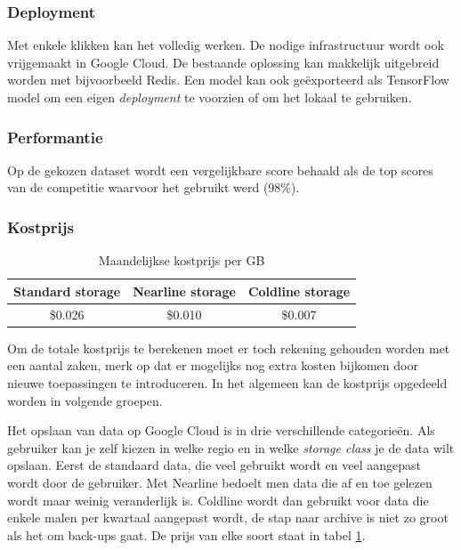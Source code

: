\subsubsection{Deployment}
\label{sucsubsec:google-nfr-deployment}

Met enkele klikken kan het volledig werken. De nodige infrastructuur wordt ook vrijgemaakt in Google Cloud. De bestaande oplossing kan makkelijk uitgebreid worden met bijvoorbeeld Redis. Een model kan ook geëxporteerd als TensorFlow model om een eigen \textit{deployment} te voorzien of om het lokaal te gebruiken.

\subsubsection{Performantie}
\label{sucsubsec:google-nfr-performantie}

Op de gekozen dataset wordt een vergelijkbare score behaald als de top scores van de competitie waarvoor het gebruikt werd (98\%).

\subsubsection{Kostprijs}
\label{sucsubsec:google-nfr-price}

\begin{table}[b!]
    \centering
    \begin{tabular}{||c c c||} 
        \hline
        Standard storage & Nearline storage & Coldline storage \\ [0.5ex] 
        \hline\hline
        \$0.026 & \$0.010 & \$0.007  \\ 
        \hline
    \end{tabular}
    \caption{Maandelijkse kostprijs per GB}
    \label{table:google-storage-price}
\end{table}

Om de totale kostprijs te berekenen moet er toch rekening gehouden worden met een aantal zaken, merk op dat er mogelijks nog extra kosten bijkomen door nieuwe toepassingen te introduceren. In het algemeen kan de kostprijs opgedeeld worden in volgende groepen.

Het opslaan van data op Google Cloud is in drie verschillende categorieën. Als gebruiker kan je zelf kiezen in welke regio en in welke \textit{storage class} je de data wilt opslaan. Eerst de standaard data, die veel gebruikt wordt en veel aangepast wordt door de gebruiker. Met Nearline bedoelt men data die af en toe gelezen wordt maar weinig veranderlijk is. Coldline wordt dan gebruikt voor data die enkele malen per kwartaal aangepast wordt, de stap naar archive is niet zo groot als het om back-ups gaat. De prijs van elke soort staat in tabel \ref{table:google-storage-price}.

